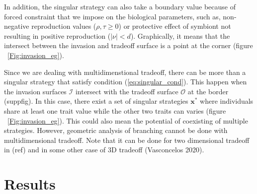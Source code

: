\documentclass[11pt]{article}
\begin{document}
In addition, the singular strategy can also take a boundary value because of forced constraint that we impose on the biological parameters, such as, non-negative reproduction values ($\rho, \tau \geq 0$) or protective effect of symbiont not resulting in positive reproduction ($\mid \nu \mid < d$). Graphically, it means that the intersect between the invasion and tradeoff surface is a point at the corner (figure ~\ref{Fig:invasion_eg}). 

Since we are dealing with multidimenstional tradeoff, there can be more than a singular strategy that satisfy condition (\ref{eq:singular_cond}). This happen when the invasion surfaces $\mathcal{I}$ intersect with the tradeoff surface $\mathcal{O}$ at the border (suppfig). In this case, there exist a set of singular strategies $\mathbf{x}^*$ where individuals share at least one trait value while the other two traits can varies (figure ~\ref{Fig:invasion_eg}). This could also mean the potential of coexisting of multiple strategies. However, geometric analysis of branching cannot be done with multidimensional tradeoff. Note that it can be done for two dimensional tradeoff in (ref) and in some other case of 3D tradeoff (Vasconcelos 2020).


\section*{Results}

%
%
%
%
\end{document}
